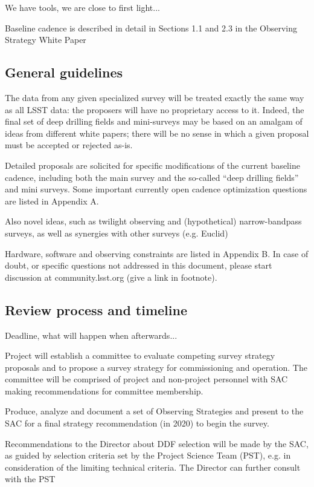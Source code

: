 \documentclass[DM,lsstdraft,toc,usenatbib]{lsstdoc}
\begin{document}
We have tools, we are close to first light... 

Baseline cadence is described in detail in Sections 1.1 and 2.3 in the Observing Strategy White Paper 


\subsection{General guidelines} 

The data from any given specialized survey will be treated exactly the same way as all LSST 
data: the proposers will have no proprietary access to it.  Indeed, the final set of deep
drilling fields and mini-surveys may be based on an amalgam of ideas from different white 
papers; there will be no sense in which a given proposal must be accepted or rejected as-is.  


Detailed proposals are solicited for specific modifications of the current baseline cadence, 
including both the main survey and the so-called ``deep drilling fields'' and mini surveys. 
Some important currently open cadence optimization questions are listed in Appendix A. 

Also novel ideas, such as twilight observing and (hypothetical) narrow-bandpass surveys,
as well as synergies with other surveys (e.g. Euclid)


Hardware, software and observing constraints are listed in Appendix B. In case of doubt,
or specific questions not addressed in this document, please start discussion at 
community.lsst.org (give a link in footnote). 




\subsection{Review process and timeline}

Deadline, what will happen when afterwards...

Project will establish a committee to evaluate competing survey strategy proposals and to propose 
a survey strategy for commissioning and operation. The committee will be comprised of project and 
non-project personnel with SAC making recommendations for committee membership. 

Produce, analyze and document a set of Observing Strategies and present to 
the SAC for a final strategy recommendation (in 2020) to begin the survey.

Recommendations to the Director about DDF selection will be made by the SAC, as guided by selection criteria set by the Project Science Team (PST), e.g. in consideration of the limiting technical criteria. The Director can further consult with the PST
\end{document}
